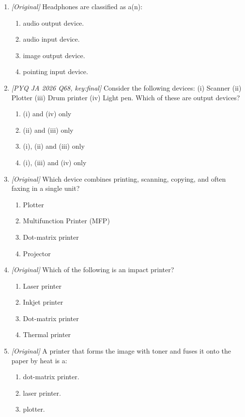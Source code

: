 \begin{enumerate}[label=\textbf{Q\arabic*.}, leftmargin=*]
\item \textit{[Original]} Headphones are classified as a(n):
  \begin{enumerate}[label=\Alph*.]
    \item audio output device.
    \item audio input device.
    \item image output device.
    \item pointing input device.
  \end{enumerate}
\item \textit{[PYQ JA 2026 Q68, key:final]} Consider the following devices:
  (i) Scanner (ii) Plotter (iii) Drum printer (iv) Light pen. Which of these
  are output devices?
  \begin{enumerate}[label=\Alph*.]
    \item (i) and (iv) only
    \item (ii) and (iii) only
    \item (i), (ii) and (iii) only
    \item (i), (iii) and (iv) only
  \end{enumerate}
\item \textit{[Original]} Which device combines printing, scanning, copying,
  and often faxing in a single unit?
  \begin{enumerate}[label=\Alph*.]
    \item Plotter
    \item Multifunction Printer (MFP)
    \item Dot-matrix printer
    \item Projector
  \end{enumerate}
\item \textit{[Original]} Which of the following is an impact printer?
  \begin{enumerate}[label=\Alph*.]
    \item Laser printer
    \item Inkjet printer
    \item Dot-matrix printer
    \item Thermal printer
  \end{enumerate}
\item \textit{[Original]} A printer that forms the image with toner and fuses
  it onto the paper by heat is a:
  \begin{enumerate}[label=\Alph*.]
    \item dot-matrix printer.
    \item laser printer.
    \item plotter.

\end{enumerate}
\end{enumerate}
